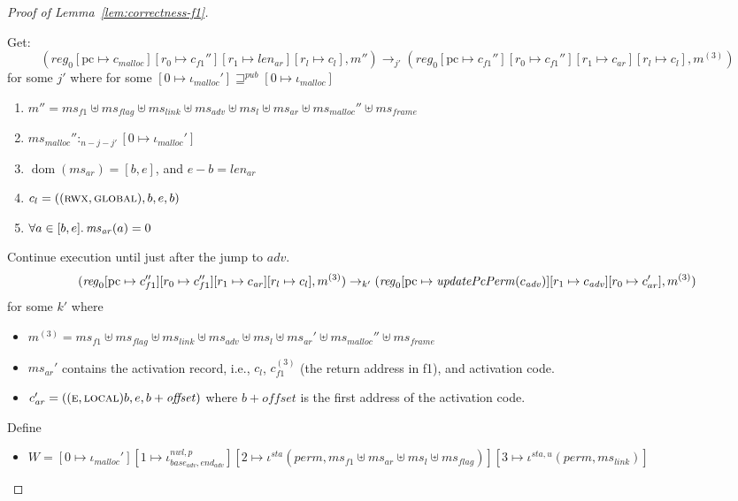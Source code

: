 \documentclass[a4paper]{article}
\newcommand{\update}[2]{[#1 \mapsto #2]}
\DeclareMathOperator{\dom}{dom}
\newcommand{\var}[1]{\mathit{#1}}
\newcommand{\hs}{\var{ms}}
\newcommand{\ms}{\hs}
\newcommand{\pcreg}{\mathrm{pc}}
\newcommand{\start}{\var{base}}
\newcommand{\addrend}{\var{end}}
\newcommand{\reg}{\var{reg}}
\newcommand{\heap}{\var{mem}}
\newcommand{\perm}{\var{perm}}
\newcommand{\adv}{\var{adv}}
\newcommand{\link}{\var{link}}
\newcommand{\flag}{\var{flag}}
\newcommand{\nwl}{\var{nwl}}
\newcommand{\sta}{\var{sta}}
\newcommand{\plainfun}[2]{
  \ifthenelse{\equal{#2}{}}
  {\mathit{#1}}
  {\mathit{#1}(#2)}
}
\newcommand{\updatePcPerm}[1]{\plainfun{updatePcPerm}{#1}}
\newcommand{\futurewk}{\mathbin{\sqsupseteq}^{\var{pub}}}
\newcommand{\heapSat}[3][\heap]{#1 :_{#2} #3}
\newcommand{\codelabel}[1]{\mathit{#1}}
\newcommand{\malloc}{\codelabel{malloc}}
\newcommand{\plainperm}[1]{\textsc{#1}}
\newcommand{\entry}{\plainperm{e}}
\newcommand{\rwx}{\plainperm{rwx}}
\newcommand{\local}{\plainperm{local}}
\newcommand{\glob}{\plainperm{global}}
\newcommand{\step}[1][]{\rightarrow_{#1}}
\begin{document}
\begin{proof}[Proof of Lemma~\ref{lem:correctness-f1}]
\begin{itemize}
  \end{itemize}
  Get:
  \[
    (\reg_0\update{\pcreg}{c_\malloc}\update{r_0}{c_{f1}''}\update{r_1}{\var{len}_{\var{ar}}}\update{r_l}{c_l},m'')
    \step[j']
    (\reg_0\update{\pcreg}{c_{f1}''}\update{r_0}{c_{f1}''}\update{r_1}{c_{\var{ar}}}\update{r_l}{c_l},m^{(3)})
  \]
  for some $j'$ where for some $[0 \mapsto \iota_{\malloc}'] \futurewk [0 \mapsto \iota_{\malloc}]$
  \begin{enumerate}[resume]
  \item $m'' = \hs_{f1} \uplus 
    \hs_\flag \uplus                
    \ms_{\var{link}} \uplus 
    \hs_\adv \uplus 
    \ms_{l} \uplus
    \ms_{\var{ar}} \uplus
    \ms_{\malloc}'' \uplus 
    \hs_{\var{frame}} $
  \item $\heapSat[\ms_{\malloc}'']{n-j-j'}{[0 \mapsto \iota_{\malloc}']}$ \label{f1:mallocsat}
  \item $\dom(\hs_{\var{ar}}) = [b,e]$, and $e-b = \var{len}_{\var{ar}}$
  \item $c_l = ((\rwx,\glob),b,e,b)$ \label{test}
  \item $\forall a \in [b,e] \ldotp \ms_{\var{ar}}(a) = 0$
  \end{enumerate}
  Continue execution until just after the jump to $\var{adv}$.
  \[
    (\reg_0\update{\pcreg}{c_{f1}''}\update{r_0}{c_{f1}''}\update{r_1}{c_{\var{ar}}}\update{r_l}{c_l},m^{(3)})
    \step[k']
    (\reg_0\update{\pcreg}{\updatePcPerm{c_{\var{adv}}}}\update{r_1}{c_{\var{adv}}}\update{r_0}{c_{ar}'},m^{(3)})
  \]
  for some $k'$ where
  \begin{itemize}
  \item $m^{(3)} = \hs_{f1} \uplus 
    \hs_\flag \uplus                
    \ms_{\var{link}} \uplus 
    \hs_\adv \uplus 
    \ms_{l} \uplus
    \ms_{\var{ar}}' \uplus
    \ms_{\malloc}'' \uplus 
    \hs_{\var{frame}} $
  \item $\ms_{\var{ar}}'$ contains the activation record, i.e., $c_l$, $c_{f1}^{(3)}$ (the return address in f1), and activation code.
  \item $c_{\var{ar}}' = ((\entry,\local)b,e,b+\var{offset})$ where $b+\var{offset}$ is the first address of the activation code.
  \end{itemize}
  Define
  \begin{itemize}
  \item $W = [0 \mapsto \iota_\malloc']
    [1 \mapsto \iota^{\nwl,p}_{\start_\adv,\addrend_\adv}]
    [2 \mapsto \iota^\sta (\perm,\ms_{f1} \uplus \ms_{\var{ar}} \uplus \ms_l \uplus \ms_\flag)]
    [3 \mapsto \iota^{\sta,u}(\perm,\ms_\link)]$

\end{itemize}
\end{proof}
\end{document}
